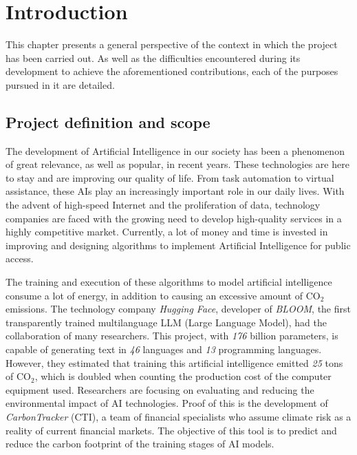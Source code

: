 \chapter*{Introduction}

This chapter presents a general perspective of the context in which the project has been carried out. As well as the difficulties encountered during its development to achieve the aforementioned contributions, each of the purposes pursued in it are detailed.


\section{Project definition and scope}

The development of Artificial Intelligence in our society has been a phenomenon of great relevance, as well as popular, in recent years. These technologies are here to stay and are improving our quality of life. From task automation to virtual assistance\cite{lugano2017virtual}, these AIs play an increasingly important role in our daily lives. With the advent of high-speed Internet and the proliferation of data, technology companies are faced with the growing need to develop high-quality services in a highly competitive market. Currently, a lot of money and time is invested in improving and designing algorithms to implement Artificial Intelligence for public access\cite{thomas2021global}.


The training and execution of these algorithms to model artificial intelligence consume a lot of energy, in addition to causing an excessive amount of CO\(_2\) emissions. The technology company \textit{Hugging Face}, developer of \textit{BLOOM}\cite{BloomAI}, the first transparently trained multilanguage LLM (Large Language Model), had the collaboration of many researchers. This project, with \textit{176} billion parameters, is capable of generating text in \textit{46} languages and \textit{13} programming languages. However, they estimated that training this artificial intelligence emitted \textit{25} tons of CO\(_2\), which is doubled when counting the production cost of the computer equipment used\cite{kirkpatrick2023carbon}. Researchers are focusing on evaluating and reducing the environmental impact of AI technologies. Proof of this is the development of \textit{CarbonTracker}\cite{jeppesen2021carbon} (CTI), a team of financial specialists who assume climate risk as a reality of current financial markets. The objective of this tool is to predict and reduce the carbon footprint of the training stages of AI\cite{mor2021artificial} models.


